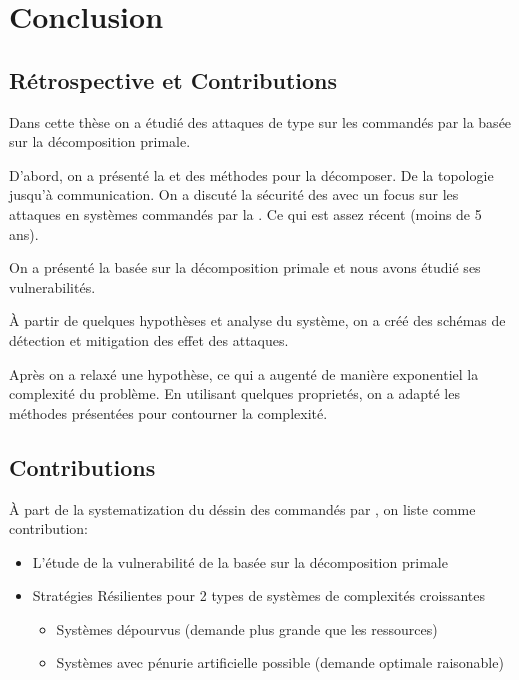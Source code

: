 \documentclass[../main.tex]{subfiles}
\begin{document}
\newpage
\section{Conclusion}\label{sec:conclusion_fr}

\subsection{Rétrospective et Contributions}\label{sec:retr-contr_fr}
Dans cette thèse on a étudié des attaques de type \fdi{} sur les \cps{} commandés par la \dmpc{} basée sur la décomposition primale.

D'abord, on a présenté la \dmpc{} et des méthodes pour la décomposer.
De la topologie jusqu'à communication.
On a discuté la sécurité des \cps{} avec un focus sur les attaques en systèmes commandés par la \dmpc{}.
Ce qui est assez récent (moins de 5 ans).

On a présenté la \dmpc{} basée sur la décomposition primale et nous avons étudié ses vulnerabilités.

À partir de quelques hypothèses et analyse du système, on a créé des schémas de détection et mitigation des effet des attaques.

Après on a relaxé une hypothèse, ce qui a augenté de manière exponentiel la complexité du problème.
En utilisant quelques proprietés, on a adapté les méthodes présentées pour contourner la complexité.

\subsection{Contributions}
À part de la systematization du déssin des \cps{} commandés par \dmpc{}, on liste comme contribution:
\begin{itemize}
  \item L'étude de la vulnerabilité de la \dmpc{} basée sur la décomposition primale
  \item Stratégies Résilientes pour 2 types de systèmes de complexités croissantes
        \begin{itemize}
          \item Systèmes dépourvus (demande plus grande que les ressources)
          \item Systèmes avec pénurie artificielle possible (demande optimale raisonable)
        \end{itemize}
\end{itemize}
\end{document}
